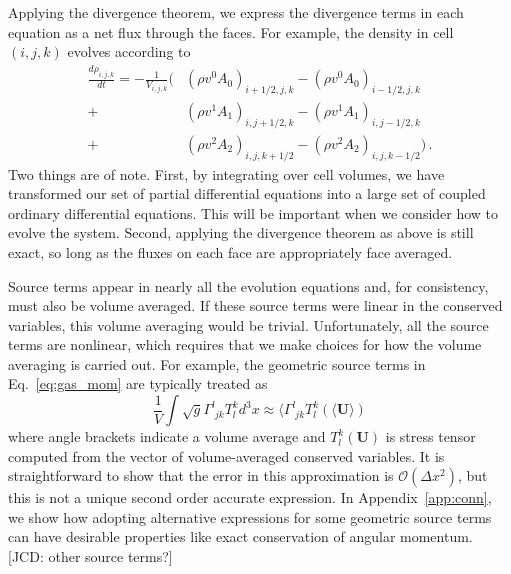 \documentclass[iop]{emulateapj}
\begin{document}
Applying the divergence theorem, we express the divergence terms in each equation as a net flux through the faces.  For example, the density in cell $(i,j,k)$ evolves according to
\begin{equation}
\begin{split}
\frac{d \rho_{i,j,k}}{dt} = -\frac{1}{V_{i,j,k}} (&(\rho v^0 A_0)_{i+1/2,j,k} - (\rho v^0 A_0)_{i-1/2,j,k} \\ + &(\rho v^1 A_1)_{i,j+1/2,k} - (\rho v^1  A_1)_{i,j-1/2,k} \\ + &(\rho v^2 A_2)_{i,j,k+1/2} - (\rho v^2 A_2)_{i,j,k-1/2})\,.
\end{split}
\end{equation}
Two things are of note.  First, by integrating over cell volumes, we have transformed our set of partial differential equations into a large set of coupled ordinary differential equations.  This will be important when we consider how to evolve the system.  Second, applying the divergence theorem as above is still exact, so long as the fluxes on each face are appropriately face averaged.

Source terms appear in nearly all the evolution equations and, for consistency, must also be volume averaged.  If these source terms were linear in the conserved variables, this volume averaging would be trivial.  Unfortunately, all the source terms are nonlinear, which requires that we make choices for how the volume averaging is carried out.  For example, the geometric source terms in Eq.~\ref{eq:gas_mom} are typically treated as
\begin{equation}
\frac{1}{V} \int \sqrt{g} \Gamma^l_{\;jk} T^k_l d^3x \approx \langle \Gamma^l_{\;jk} T^k_l(\langle\mathbf{U}\rangle)
\end{equation}
where angle brackets indicate a volume average and $T^k_l(\mathbf{U})$ is stress tensor computed from the vector of volume-averaged conserved variables.  It is straightforward to show that the error in this approximation is $\mathcal{O}(\Delta x^2)$, but this is not a unique second order accurate expression.  In Appendix~\ref{app:conn}, we show how adopting alternative expressions for some geometric source terms can have desirable properties like exact conservation of angular momentum. [JCD: other source terms?]
\end{document}
